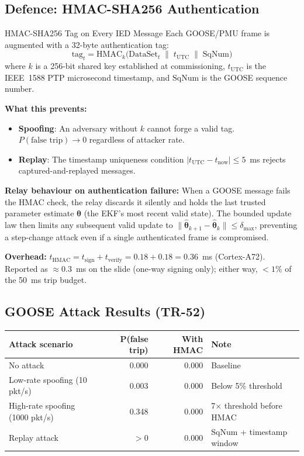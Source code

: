 \documentclass[12pt,a4paper]{article}
\begin{document}
\subsection{Defence: HMAC-SHA256 Authentication}

\begin{archbox}{HMAC-SHA256 Tag on Every IED Message}
Each GOOSE/PMU frame is augmented with a 32-byte authentication tag:
\[
  \mathrm{tag}_t = \mathrm{HMAC}_k\!\bigl(\mathrm{DataSet}_t \;\|\; t_\mathrm{UTC} \;\|\; \mathrm{SqNum}\bigr)
\]
where $k$ is a 256-bit shared key established at commissioning, $t_\mathrm{UTC}$ is the IEEE~1588 PTP microsecond timestamp, and $\mathrm{SqNum}$ is the GOOSE sequence number.

\textbf{What this prevents:}
\begin{itemize}[nosep]
  \item \textbf{Spoofing}: An adversary without $k$ cannot forge a valid tag. $P(\text{false trip}) \to 0$ regardless of attacker rate.
  \item \textbf{Replay}: The timestamp uniqueness condition $|t_\mathrm{UTC} - t_\mathrm{now}| \leq 5$~ms rejects captured-and-replayed messages.
\end{itemize}

\textbf{Relay behaviour on authentication failure:} When a GOOSE message fails the HMAC check, the relay discards it silently and holds the last trusted parameter estimate $\hat{\bm{\theta}}$ (the EKF's most recent valid state). The bounded update law then limits any subsequent valid update to $\|\hat{\bm{\theta}}_{k+1} - \hat{\bm{\theta}}_k\| \leq \delta_\mathrm{max}$, preventing a step-change attack even if a single authenticated frame is compromised.

\textbf{Overhead:} $t_\mathrm{HMAC} = t_\mathrm{sign} + t_\mathrm{verify} = 0.18 + 0.18 = 0.36$~ms (Cortex-A72). Reported as $\approx 0.3$~ms on the slide (one-way signing only); either way, $< 1\%$ of the 50~ms trip budget.
\end{archbox}

\subsection{GOOSE Attack Results (TR-52)}

\begin{center}
\begin{tabular}{@{}lrrl@{}}
\toprule
\textbf{Attack scenario} & \textbf{P(false trip)} & \textbf{With HMAC} & \textbf{Note} \\
\midrule
No attack                    & 0.000 & 0.000 & Baseline \\
Low-rate spoofing (10 pkt/s) & 0.003 & 0.000 & Below 5\% threshold \\
High-rate spoofing (1000 pkt/s) & 0.348 & 0.000 & 7$\times$ threshold before HMAC \\
Replay attack                & $>0$  & 0.000 & SqNum + timestamp window \\
\bottomrule
\end{tabular}
\end{center}
\end{document}
